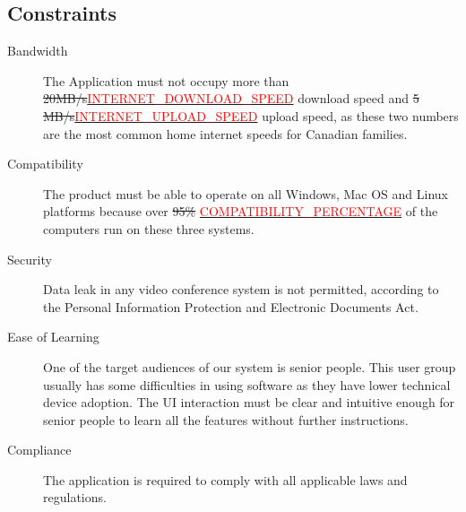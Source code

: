 \documentclass[12pt]{article}
\begin{document}
\subsection{Constraints}
\begin{description}
    \item[Bandwidth] The Application must not occupy more than\\ \sout{20MB/s}\hyperref[sec:symbolic-constants]{\textcolor{red}{INTERNET\_DOWNLOAD\_SPEED}} download speed\cite{downloadSpeed2018} and \sout{5 MB/s}\hyperref[sec:symbolic-constants]{\textcolor{red}{INTERNET\_UPLOAD\_SPEED}} upload speed\cite{uploadSpeed2021}, as these two numbers are the most common home internet speeds for Canadian families.
    \item[Compatibility] The product must be able to operate on all Windows, Mac OS and Linux platforms because over \sout{95\%} 
    \hyperref[sec:symbolic-constants]{\textcolor{red}{COMPATIBILITY\_PERCENTAGE}} of the computers run on these three systems\cite{OSMarketShare}.
    \item[Security] Data leak in any video conference system is not permitted, according to the Personal Information Protection and Electronic Documents Act\cite{Law1}.
    \item[Ease of Learning] One of the target audiences of our system is senior people. This user group usually has some difficulties in using software as they have lower technical device adoption\cite{olderAdultsTechUse}. The UI interaction must be clear and intuitive enough for senior people to learn all the features without further instructions.
    \item[Compliance] The application is required to comply with all applicable laws\cite{Law1}\cite{Law2}\cite{Law3} and regulations.
\end{description}
\end{document}
